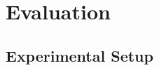 \documentclass[../report.tex]{subfiles}
\begin{document}
    \section{Evaluation}
    \label{sec:evaluation}


    
    
    
    

    \subsection{Experimental Setup}
\end{document}
